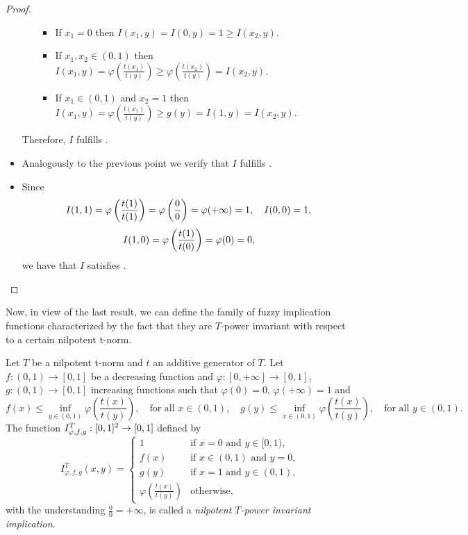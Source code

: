 \begin{proof}
\begin{itemize}
\begin{itemize}
\begin{itemize}
				\item If $x_1=0$ then $I(x_1,y)=I(0,y)=1 \geq I(x_2,y).$
				\item If $x_1,x_2 \in (0,1)$ then $I(x_1,y)=\varphi \left(\frac{t(x_1)}{t(y)}\right) \geq \varphi \left(\frac{t(x_2)}{t(y)}\right) = I(x_2,y).$
				\item If $x_1 \in (0,1)$ and $x_2=1$ then $I(x_1,y)=\varphi \left(\frac{t(x_1)}{t(y)}\right) \geq g(y)=I(1,y)=I(x_2,y).$
			\end{itemize}
		\end{itemize} 
		Therefore, $I$ fulfills \Ione.
		\item Analogously to the previous point we verify that $I$ fulfills \Itwo.
		\item Since
		$$ I(1,1)= \varphi \left(\frac{t(1)}{t(1)}\right) = \varphi\left(\frac{0}{0}\right)= \varphi(+\infty)=1, \quad I(0,0)=1,$$
		$$I(1,0)=\varphi \left(\frac{t(1)}{t(0)}\right)=\varphi(0)=0,$$
		we have that $I$ satisfies \Ithree. \qedhere
	\end{itemize}
\end{proof}

Now, in view of the last result, we can define the family of fuzzy implication functions characterized by the fact that they are $T$-power invariant with respect to a certain nilpotent t-norm.

\begin{definition}\label{def:nilpot:TPowerInv}
	Let $T$ be a nilpotent t-norm and $t$ an additive generator of $T$. Let $f:(0,1) \to [0,1]$ be a decreasing function and $\varphi:[0,+\infty] \to [0,1]$, $g: (0,1) \to [0,1]$ increasing functions such that $\varphi(0)=0$, $\varphi(+\infty)=1$ and
	\begin{equation}\label{eq:def:nilpot:TPowerInv:MonotonicityCond}
		f(x) \leq \inf_{y \in (0,1)} \varphi \left(\frac{t(x)}{t(y)}\right), \quad \text{for all } x \in (0,1), \quad
		g(y) \leq \inf_{x \in (0,1)} \varphi \left(\frac{t(x)}{t(y)}\right), \quad \text{for all } y \in (0,1).
	\end{equation}
	The function $I^T_{\varphi,f,g}:[0,1]^2 \to [0,1]$ defined  by
	\begin{equation}\label{eq:nilpot:TPowerInv:Expression}
		I^T_{\varphi,f,g}(x,y) =\left\{ \begin{array}{ll}
			1 & \text{if } x=0 \text{ and } y \in [0,1),\\
			f(x) &   \text{if }   x \in (0,1) \text{ and } y=0, \\
			g(y) &  \text{if }  x = 1 \text{ and } y\in (0,1), \\
			\varphi \left(\frac{t(x)}{t(y)}\right) &  \text{otherwise},
		\end{array}
		\right.
	\end{equation}
	with the understanding $\frac{0}{0} = + \infty$, is called a \emph{nilpotent $T$-power invariant implication}.
\end{definition}

